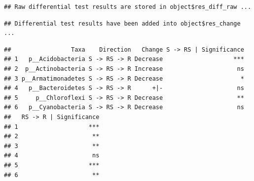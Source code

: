 \documentclass[
]{book}
\newenvironment{Shaded}{\begin{snugshade}}{\end{snugshade}}
\newcommand{\AttributeTok}[1]{\textcolor[rgb]{0.77,0.63,0.00}{#1}}
\newcommand{\CommentTok}[1]{\textcolor[rgb]{0.56,0.35,0.01}{\textit{#1}}}
\newcommand{\ConstantTok}[1]{\textcolor[rgb]{0.00,0.00,0.00}{#1}}
\newcommand{\FloatTok}[1]{\textcolor[rgb]{0.00,0.00,0.81}{#1}}
\newcommand{\FunctionTok}[1]{\textcolor[rgb]{0.00,0.00,0.00}{#1}}
\newcommand{\NormalTok}[1]{#1}
\newcommand{\OtherTok}[1]{\textcolor[rgb]{0.56,0.35,0.01}{#1}}
\newcommand{\SpecialCharTok}[1]{\textcolor[rgb]{0.00,0.00,0.00}{#1}}
\newcommand{\StringTok}[1]{\textcolor[rgb]{0.31,0.60,0.02}{#1}}
\begin{document}
\begin{Shaded}
\end{Shaded}

\begin{verbatim}
## Raw differential test results are stored in object$res_diff_raw ...
\end{verbatim}

\begin{verbatim}
## Differential test results have been added into object$res_change ...
\end{verbatim}

\begin{Shaded}
\end{Shaded}

\begin{verbatim}
##                 Taxa    Direction   Change S -> RS | Significance
## 1   p__Acidobacteria S -> RS -> R Decrease                    ***
## 2  p__Actinobacteria S -> RS -> R Increase                     ns
## 3 p__Armatimonadetes S -> RS -> R Decrease                      *
## 4   p__Bacteroidetes S -> RS -> R      +|-                     ns
## 5     p__Chloroflexi S -> RS -> R Decrease                     **
## 6   p__Cyanobacteria S -> RS -> R Decrease                     ns
##   RS -> R | Significance
## 1                    ***
## 2                     **
## 3                     **
## 4                     ns
## 5                    ***
## 6                     **
\end{verbatim}

\begin{Shaded}
\end{Shaded}
\end{document}
